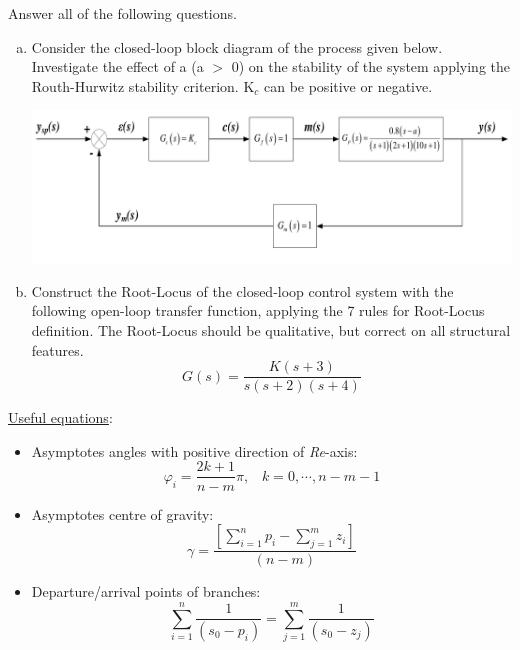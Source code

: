 \documentclass[calculator,datasheet,solutions]{exam}
\newcommand{\frc}{\displaystyle\frac}
\begin{document}
\begin{question}

Answer all of the following questions.

\begin{enumerate}[(a)]
%
\item Consider the closed-loop block diagram of the process given below. Investigate the effect of a (a $>$ 0) on the stability of the system applying the Routh-Hurwitz stability criterion. K$_{c}$ can be positive or negative.~
\begin{center}
\includegraphics[width=\columnwidth]{./Pics/EG5597_Control_1_May_2014-5.pdf}
\end{center} 
\item Construct the Root-Locus of the closed-loop control system with the following open-loop transfer function, applying the 7 rules for Root-Locus definition. The Root-Locus should be qualitative, but correct on all structural features.~
\begin{displaymath}
G(s) = \frc{K(s+3)}{s(s+2)(s+4)}  
\end{displaymath}
\end{enumerate}

\underline{Useful equations}:
\begin{itemize}
\item Asymptotes angles with positive direction of {\it Re}-axis: 
\begin{displaymath}
\varphi_{i} = \frc{2k + 1}{n -m}\pi,\;\;\;k=0,\cdots,n-m-1
\end{displaymath}

\item Asymptotes centre of gravity:
\begin{displaymath}
\gamma=\frc{\left[\sum\limits_{i=1}^{n}p_{i}-\sum\limits_{j=1}^{m}z_{i}\right]}{(n-m)}
\end{displaymath}

\item Departure/arrival points of branches: 
\begin{displaymath}
\sum\limits_{i=1}^{n}\frc{1}{\left(s_{0}-p_{i}\right)}=\sum\limits_{j=1}^{m}\frc{1}{\left(s_{0}-z_{j}\right)}
\end{displaymath} 

\end{itemize}

\end{question}
\end{document}
